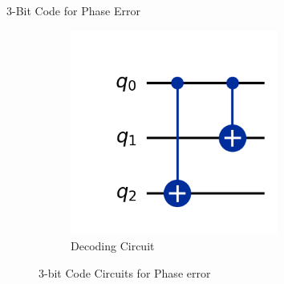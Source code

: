 \documentclass[10pt]{beamer}
\begin{document}
\begin{frame}{3-Bit Code for Phase Error}
\begin{figure}[h!]
\begin{subfigure}[b]{0.3\columnwidth}
        \includegraphics[width=0.75\textwidth]{../../Codes/results/3bitPhaseEC/DecodingCircuit.png}
        \caption{Decoding Circuit}
        \label{fig:3bitPhaseAncillaCircuit}
    \end{subfigure}

    \caption{3-bit Code Circuits for Phase error}
    \label{fig:three_images}
\end{figure}
\end{frame}

\end{document}
